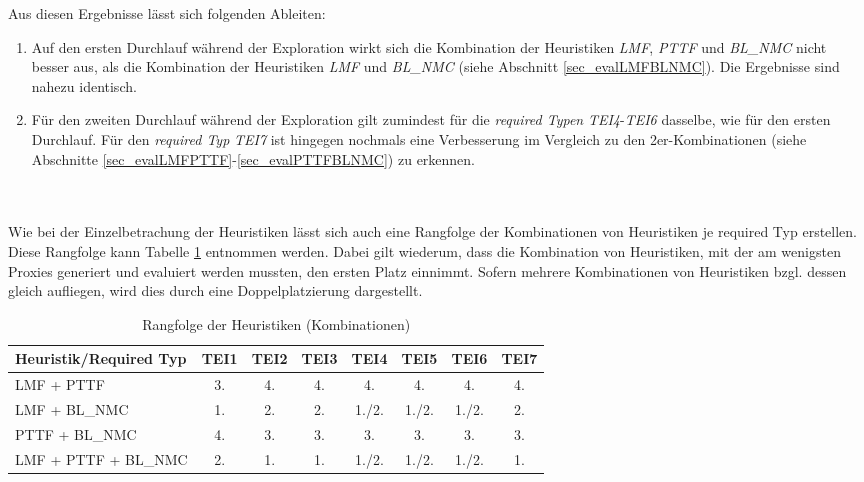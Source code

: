 \begin{multicols}{2}
\columnbreak
{}
\end{multicols}
\noindent
Aus diesen Ergebnisse lässt sich folgenden Ableiten:
\begin{enumerate}
\item Auf den ersten Durchlauf während der Exploration wirkt sich die Kombination der Heuristiken \emph{LMF}, \emph{PTTF} und \emph{BL\_NMC} nicht besser aus, als die Kombination der Heuristiken \emph{LMF} und \emph{BL\_NMC} (siehe Abschnitt \ref{sec_evalLMFBLNMC}). Die Ergebnisse sind nahezu identisch.
\item Für den zweiten Durchlauf während der Exploration gilt zumindest für die \emph{required Typen} \emph{TEI4}-\emph{TEI6} dasselbe, wie für den ersten Durchlauf. Für den \emph{required Typ} \emph{TEI7} ist hingegen nochmals eine Verbesserung im Vergleich zu den 2er-Kombinationen (siehe Abschnitte \ref{sec_evalLMFPTTF}-\ref{sec_evalPTTFBLNMC}) zu erkennen.
\end{enumerate}
\noindent
\\\\
Wie bei der Einzelbetrachung der Heuristiken lässt sich auch eine Rangfolge der Kombinationen von Heuristiken je required Typ erstellen. Diese Rangfolge kann Tabelle \ref{tab_rankingCombi} entnommen werden. Dabei gilt wiederum, dass die Kombination von Heuristiken, mit der am wenigsten Proxies generiert und evaluiert werden mussten, den ersten Platz einnimmt. Sofern mehrere Kombinationen von Heuristiken bzgl. dessen gleich aufliegen, wird dies durch eine Doppelplatzierung dargestellt.
\begin{table}[!h]
\centering
\begin{tabular}{|l|c|c|c|c|c|c|c|}
\hline
\hline
\textbf{Heuristik/Required Typ} & \textbf{TEI1} & \textbf{TEI2}& \textbf{TEI3}& \textbf{TEI4}& \textbf{TEI5}& \textbf{TEI6}& \textbf{TEI7}\\
\hline
\hline
LMF + PTTF &3.&4.&4.&4.&4.&4.&4.\\
\hline
LMF + BL\_NMC &1. &2.&2.&1./2.&1./2.&1./2.&2. \\
\hline
PTTF + BL\_NMC &4. &3.&3.&3.&3.&3.& 3.\\
\hline
LMF + PTTF + BL\_NMC &2. &1. &1. & 1./2.&1./2.&1./2.&1.\\
\hline
\hline
\end{tabular}
\caption{Rangfolge der Heuristiken (Kombinationen)}
\label{tab_rankingCombi}
\end{table}